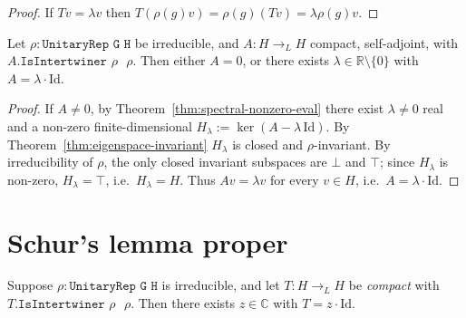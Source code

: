 \begin{proof}
  If $T v = \lambda v$ then
  $T(\rho(g) v) = \rho(g)(Tv) = \lambda \rho(g) v$.
\end{proof}

\begin{theorem}
  \label{thm:irrep-selfadj-scalar}
  \leanok
  Let $\rho : \texttt{UnitaryRep G H}$ be irreducible, and
  $A : H \to_L H$ compact, self-adjoint, with
  $A.\texttt{IsIntertwiner $\rho$ $\rho$}$. Then either $A = 0$, or
  there exists $\lambda \in \mathbb R \setminus \{0\}$ with
  $A = \lambda \cdot \mathrm{Id}$.
\end{theorem}

\begin{proof}
  If $A \neq 0$, by Theorem~\ref{thm:spectral-nonzero-eval} there
  exist $\lambda \neq 0$ real and a non-zero finite-dimensional
  $H_\lambda := \ker(A - \lambda\,\mathrm{Id})$.
  By Theorem~\ref{thm:eigenspace-invariant} $H_\lambda$ is closed and
  $\rho$-invariant. By irreducibility of $\rho$, the only closed
  invariant subspaces are $\bot$ and $\top$; since $H_\lambda$ is
  non-zero, $H_\lambda = \top$, i.e.\ $H_\lambda = H$. Thus
  $A v = \lambda v$ for every $v \in H$, i.e.\ $A = \lambda \cdot \mathrm{Id}$.
\end{proof}

\section{Schur's lemma proper}

\begin{theorem}
  \label{thm:schur-scalar}
  \leanok
  Suppose $\rho : \texttt{UnitaryRep G H}$ is irreducible, and let
  $T : H \to_L H$ be \emph{compact} with
  $T.\texttt{IsIntertwiner $\rho$ $\rho$}$. Then there exists
  $z \in \mathbb C$ with $T = z \cdot \mathrm{Id}$.
\end{theorem}

